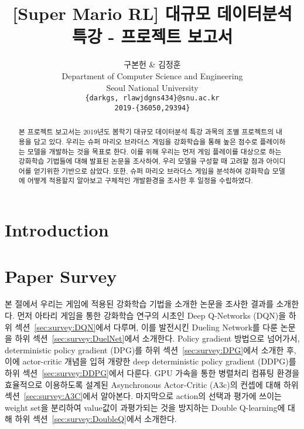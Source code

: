 \documentclass[10pt]{article}
\renewcommand{\baselinestretch}{1.3}
\begin{document}
\title{[Super Mario RL] 대규모 데이터분석 특강 - 프로젝트 보고서}

\author{
구본헌 \& 김정훈\\
Department of Computer Science and Engineering\\
Seoul National University\\
\texttt{\{darkgs, rlawjdgns434\}@snu.ac.kr}\\
\texttt{2019-\{36050,29394\}}\\
}

\renewcommand{\baselinestretch}{1.25}

\maketitle
\begin{abstract}
본 프로젝트 보고서는 2019년도 봄학기 대규모 데이터분석 특강 과목의 조별 프로젝트의 내용을 담고 있다.
우리는 슈퍼 마리오 브라더스 게임을 강화학습을 통해 높은 점수로 플레이하는 모델을 개발하는 것을 목표로 한다.
이를 위해 우리는 먼저 게임 플레이를 대상으로 하는 강화학습 기법들에 대해 발표된 논문을 조사하여, 우리 모델을 구성할 때 고려할 점과 아이디어를 얻기위한 기반으로 삼았다.
또한, 슈퍼 마리오 브라더스 게임을 분석하여 강화학습 모델에 어떻게 적용할지 알아보고 구체적인 개발환경을 조사한 후 일정을 수립하였다.
\end{abstract}



\section{Introduction}
\label{sec:intro}


\section{Paper Survey}
본 절에서 우리는 게임에 적용된 강화학습 기법을 소개한 논문을 조사한 결과를 소개한다.
먼저 아타리 게임을 통한 강화학습 연구의 시초인 Deep Q-Networks (DQN)을 하위 섹션~\ref{sec:survey:DQN}에서 다루며, 이를 발전시킨 Dueling Network를 다룬 논문을 하위 섹션~\ref{sec:survey:DuelNet}에서 소개한다.
Policy gradient 방법으로 넘어가서, deterministic policy gradient (DPG)를 하위 섹션~\ref{sec:survey:DPG}에서 소개한 후,
이에 actor-critic 개념을 입혀 개량한 deep deterministic policy gradient (DDPG)를 하위 섹션~\ref{sec:survey:DDPG}에서 다룬다.
GPU 가속을 통한 병렬처리 컴퓨팅 환경을 효율적으로 이용하도록 설계된 Asynchronous Actor-Critic (A3c)의 컨셉에 대해 하위 섹션~\ref{sec:survey:A3C}에서 알아본다.
마지막으로 action의 선택과 평가에 쓰이는 weight set을 분리하여 value값이 과평가되는 것을 방지하는 Double Q-learning에 대해 하위 섹션~\ref{sec:survey:DoubleQ}에서 소개한다.
\label{sec:survey}






\end{document}
